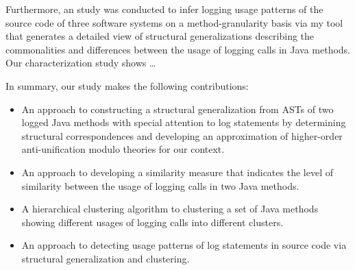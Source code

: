 

Furthermore, an study was conducted to infer logging usage patterns of the source code of three software systems on a method-granularity basis via my tool that generates a detailed view of structural generalizations describing the commonalities and differences between the usage of logging calls in Java methods. Our characterization study shows …



In summary, our study makes the following contributions:
\begin{itemize} [leftmargin=.5in]
\item An approach to constructing a structural generalization from ASTs of two logged Java methods with special attention to log statements by determining structural correspondences and developing an approximation of higher-order anti-unification modulo theories for our context.
\item An approach to developing a similarity measure that indicates the level of  similarity between the usage of logging calls in two Java methods.
\item A hierarchical clustering algorithm to clustering a set of Java methods showing different usages of logging calls into different clusters.
\item An approach to detecting usage patterns of log statements in source code via structural generalization and clustering.
\end{itemize}


